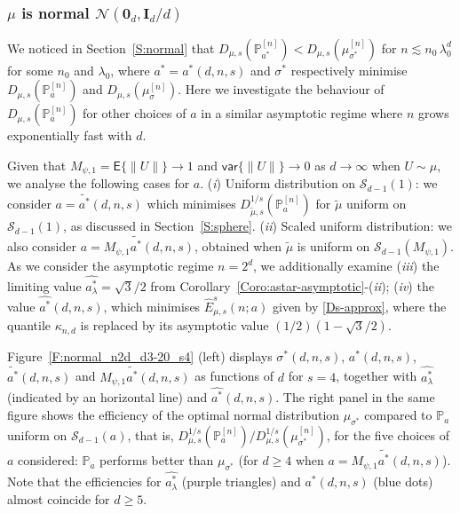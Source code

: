\documentclass{article}
\def\Ib{\mathbf{I}}
\def\Ex{\mathsf{E}}
\def\var{\mathsf{var}}
\def\ml{\lambda}
\def\ms{\sigma}
\def\PP{\mathbb{P}}
\def\SS{{\mathcal S}}
\def\0b{\mathbf{0}}
\def\SN{{\mathcal N}}
\begin{document}
\subsubsection{$\mu$ is normal $\SN(\0b_d,\Ib_d/d)$} \label{S:extreme-value-normal}

We noticed in Section~\ref{S:normal} that $D_{\mu,s}(\PP_{a^*}^{[n]}) < D_{\mu,s}(\mu^{[n]}_{\ms^*})$ for $n \lesssim n_0\, \ml_0^d$ for some $n_0$ and $\ml_0$, where $a^*=a^*(d,n,s)$ and $\ms^*$ respectively minimise $D_{\mu,s}(\PP_a^{[n]})$ and $D_{\mu,s}(\mu^{[n]}_{\ms})$. Here we investigate the behaviour of $D_{\mu,s}(\PP_{a}^{[n]})$ for other choices of $a$ in a similar asymptotic regime where $n$ grows exponentially fast with $d$.

Given that $M_{\psi,1}=\Ex\{\|U\|\} \to 1$ and $\var\{\|U\|\} \to 0$ as $d\to\infty$ when $U \sim \mu$, we analyse the following cases for $a$.
(\textit{i}) Uniform distribution on $\SS_{d-1}(1)$:
we consider $a = \widetilde{a^*}(d,n,s)$ which minimises $D_{\widetilde\mu,s}^{1/s}(\PP_a^{[n]})$ for $\widetilde\mu$ uniform on $\SS_{d-1}(1)$, as discussed in Section~\ref{S:sphere}.
(\textit{ii}) Scaled uniform distribution: we also consider $a = M_{\psi,1}\widetilde{a^*}(d,n,s)$, obtained when $\widetilde\mu$ is uniform on $\SS_{d-1}(M_{\psi,1})$.
As we consider the asymptotic regime $n = 2^d$, we additionally examine (\textit{iii}) the limiting value $\widehat{a^*_\ml} = \sqrt{3}/2$ from Corollary~\ref{Coro:astar-asymptotic}-(\textit{ii});
(\textit{iv}) the value $\widehat{a^*}(d,n,s)$, which minimises $\widehat{E}_{\mu,s}^s(n;a)$ given by \eqref{Ds-approx}, where the quantile $\kappa_{n,d}$ is replaced by its asymptotic value $(1/2)(1 - \sqrt{3}/2)$.


 Figure~\ref{F:normal_n2d_d3-20_s4} (left) displays $\ms^*(d,n,s)$, $a^*(d,n,s)$, $\widetilde{a^*}(d,n,s)$ and $M_{\psi,1}\widetilde{a^*}(d,n,s)$ as functions of $d$ for $s=4$, together with $\widehat{a^*_\ml}$ (indicated by an horizontal line) and
$\widehat{a^*}(d,n,s)$.
The right panel in the same figure shows the efficiency of the optimal normal distribution $\mu_{\ms^*}$ compared to $\PP_a$ uniform on $\SS_{d-1}(a)$, that is, $D_{\mu,s}^{1/s}(\PP_a^{[n]})/D_{\mu,s}^{1/s}(\mu_{\ms^*}^{[n]})$, for the five choices of $a$ considered: $\PP_{a}$ performs better than $\mu_{\ms^*}$ (for $d\geq 4$ when $a=M_{\psi,1}\widetilde{a^*}(d,n,s)$). Note that the efficiencies for $\widehat{a^*_\ml}$ (purple triangles) and $a^*(d,n,s)$ (blue dots) almost coincide for $d\geq 5$.
\end{document}
